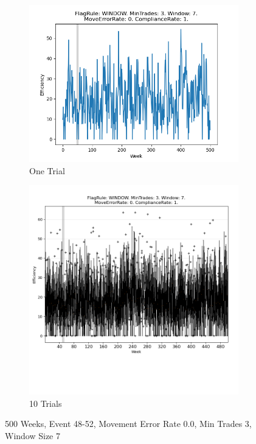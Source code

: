 \documentclass{article}%
\begin{document}
\begin{figure}[!htb]%
\begin{subfigure}[b]{0.45\linewidth}%
\includegraphics[width=\linewidth]{1055fr_WINDOW_mt_3_ws_7_er_0_cr_1_t1.png}%
\caption{One Trial}%
\end{subfigure}%
\begin{subfigure}[b]{0.45\linewidth}%
\includegraphics[clip,width=\linewidth,trim=0 4cm 0 0]{1055fr_WINDOW_mt_3_ws_7_er_0_cr_1_t10.png}%
\caption{10 Trials}%
\end{subfigure}%
\caption{500 Weeks, Event 48{-}52, Movement Error Rate 0.0, Min Trades 3, Window Size 7}%
\end{figure}
\end{document}
